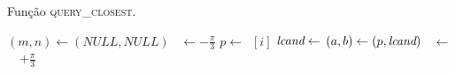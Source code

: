 \begin{algorithm}
    \caption{Função \textsc{query\_closest}.} \label{parestatico:closest}
    \begin{algorithmic}[1]
            \State $(m,n) \leftarrow (NULL, NULL)$
            \State \angulo~$\leftarrow -\frac{\pi}{3}$
                \State {} 
                    \State $p \leftarrow $~\pontos$[i]$
                    \State $\textit{lcand} \leftarrow $ 
                    \State {}
                        \State $(a, b) \leftarrow (p, \textit{lcand})$
                    \EndIf
                \EndFor
                \State \angulo~$\leftarrow$~\angulo~$ + \frac{\pi}{3}$
                \State {} 
            \EndWhile
            \State {}
        \EndFunction
    \end{algorithmic}
\end{algorithm}